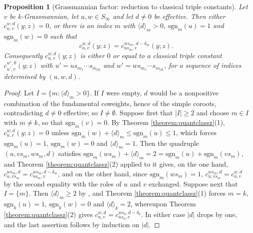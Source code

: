 \documentclass{amsart}
\newtheorem{proposition}[lemma]{Proposition}
\theoremstyle{definition}
\theoremstyle{remark}
\numberwithin{equation}{section}
\begin{document}
\begin{proposition}[Grassmannian factor: reduction to classical triple constants] \label{prop:grassmannianreduction}
Let $v$ be $k$-Grassmannian, let $u,w\in S_\infty$ and let $d\neq0$ be effective. Then either $c_{u,v}^{w,d}(y;z)=0$, or there is an index $m$ with $\langle d\rangle_m>0$, $\mathrm{sgn}_m(u)=1$ and $\mathrm{sgn}_m(w)=0$ such that
$$c_{u,v}^{w,d}(y;z)=c_{us_m,v}^{ws_m,\,d-\delta_m}(y;z).$$
Consequently $c_{u,v}^{w,d}(y;z)$ is either $0$ or equal to a classical triple constant $c_{u',v}^{w',0}(y;z)$ with $u'=us_{m_1}\cdots s_{m_{|d|}}$ and $w'=ws_{m_1}\cdots s_{m_{|d|}}$, for a sequence of indices determined by $(u,w,d)$.
\end{proposition}
\begin{proof}
Let $I=\{m:\langle d\rangle_m>0\}$. If $I$ were empty, $d$ would be a nonpositive combination of the fundamental coweights, hence of the simple coroots, contradicting $d\neq0$ effective; so $I\neq\emptyset$. Suppose first that $|I|\geq2$ and choose $m\in I$ with $m\neq k$, so that $\mathrm{sgn}_m(v)=0$. By Theorem \ref{theorem:quantclassz}(1), $c_{u,v}^{w,d}(y;z)=0$ unless $\mathrm{sgn}_m(w)+\langle d\rangle_m\leq\mathrm{sgn}_m(u)\leq1$, which forces $\mathrm{sgn}_m(u)=1$, $\mathrm{sgn}_m(w)=0$ and $\langle d\rangle_m=1$. Then the quadruple $(u,vs_m,ws_m,d)$ satisfies $\mathrm{sgn}_m(ws_m)+\langle d\rangle_m=2=\mathrm{sgn}_m(u)+\mathrm{sgn}_m(vs_m)$, and Theorem \ref{theorem:quantclassz}(2) applied to it gives, on the one hand, $c_{u,vs_m}^{ws_m,d}=c_{us_m,v}^{ws_m,d-\delta_m}$, and on the other hand, since $\mathrm{sgn}_m(ws_m)=1$, $c_{u,vs_m}^{ws_m,d}=c_{u,v}^{w,d}$ by the second equality with the roles of $u$ and $v$ exchanged. Suppose next that $I=\{m\}$. Then $\langle d\rangle_m\geq2$ by \cite[Lemma~2.10]{leung2012classical}, and Theorem \ref{theorem:quantclassz}(1) forces $m=k$, $\mathrm{sgn}_k(u)=1$, $\mathrm{sgn}_k(w)=0$ and $\langle d\rangle_k=2$, whereupon Theorem \ref{theorem:quantclassz}(2) gives $c_{u,v}^{w,d}=c_{us_k,v}^{ws_k,d-\delta_k}$. In either case $|d|$ drops by one, and the last assertion follows by induction on $|d|$.
\end{proof}
\end{document}
